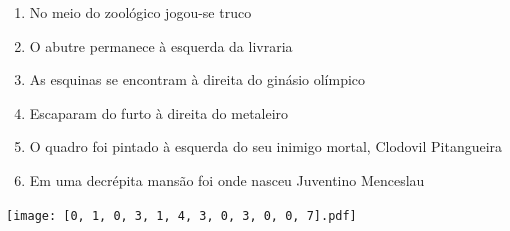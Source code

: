 \documentclass[12pt]{article}
\begin{document}
		 

\pagebreak


	\begin{enumerate}
		  \sffamily %
		  \large %


\vfill \item
No meio do zoológico	%
jogou-se truco	%

\vfill \item
O abutre permanece	%
à esquerda
da livraria	%

\vfill \item
As esquinas se encontram	%
à direita
do ginásio olímpico	%

\vfill \item
Escaparam do furto	%
à direita
do metaleiro	%

\vfill \item
O quadro foi pintado	%
à esquerda
do seu inimigo mortal, Clodovil Pitangueira	%

\vfill \item
Em uma decrépita mansão	%
foi onde nasceu Juventino Menceslau	%
	\end{enumerate}
		  
		  \hfill

		  \vfill

\texttt{[image: [0, 1, 0, 3, 1, 4, 3, 0, 3, 0, 0, 7].pdf]}


	\hfill	  	  


\pagebreak			
\end{document}
